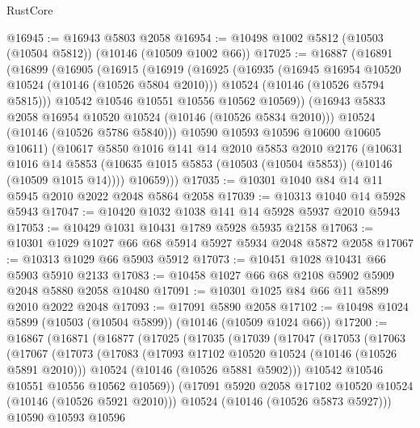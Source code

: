 \begin{lexlean}{RustCore}
\begin{coremodule}
@16945 := @16943 @5803 @2058
@16954 := @10498 @1002 @5812 (@10503 (@10504 @5812)) (@10146 (@10509 @1002 @66))
@17025 := @16887
    (@16891
      (@16899
        (@16905
          (@16915
            (@16919
              (@16925
                (@16935
                  (@16945 @16954 @10520 @10524 (@10146 (@10526 @5804 @2010)))
                  @10524
                  (@10146 (@10526 @5794 @5815)))
                @10542
                @10546
                @10551
                @10556
                @10562
                @10569))
            (@16943 @5833 @2058 @16954 @10520 @10524 (@10146 (@10526 @5834 @2010)))
            @10524
            (@10146 (@10526 @5786 @5840)))
          @10590
          @10593
          @10596
          @10600
          @10605
          @10611)
        (@10617
          @5850
          @1016
          @141
          @14
          @2010
          @5853
          @2010
          @2176
          (@10631
            @1016
            @14
            @5853
            (@10635 @1015 @5853 (@10503 (@10504 @5853)) (@10146 (@10509 @1015 @14))))
          @10659)))
@17035 := @10301 @1040 @84 @14 @11 @5945 @2010 @2022 @2048 @5864 @2058
@17039 := @10313 @1040 @14 @5928 @5943
@17047 := @10420 @1032 @1038 @141 @14 @5928 @5937 @2010 @5943
@17053 := @10429 @1031 @10431 @1789 @5928 @5935 @2158
@17063 := @10301 @1029 @1027 @66 @68 @5914 @5927 @5934 @2048 @5872 @2058
@17067 := @10313 @1029 @66 @5903 @5912
@17073 := @10451 @1028 @10431 @66 @5903 @5910 @2133
@17083 := @10458 @1027 @66 @68 @2108 @5902 @5909 @2048 @5880 @2058 @10480
@17091 := @10301 @1025 @84 @66 @11 @5899 @2010 @2022 @2048
@17093 := @17091 @5890 @2058
@17102 := @10498 @1024 @5899 (@10503 (@10504 @5899)) (@10146 (@10509 @1024 @66))
@17200 := @16867
    (@16871
      (@16877
        (@17025
          (@17035
            (@17039
              (@17047
                (@17053
                  (@17063
                    (@17067
                      (@17073
                        (@17083
                          (@17093 @17102 @10520 @10524 (@10146 (@10526 @5891 @2010)))
                          @10524
                          (@10146 (@10526 @5881 @5902)))
                        @10542
                        @10546
                        @10551
                        @10556
                        @10562
                        @10569))
                    (@17091 @5920 @2058 @17102 @10520 @10524 (@10146 (@10526 @5921 @2010)))
                    @10524
                    (@10146 (@10526 @5873 @5927)))
                  @10590
                  @10593
                  @10596

\end{coremodule}
\end{lexlean}
